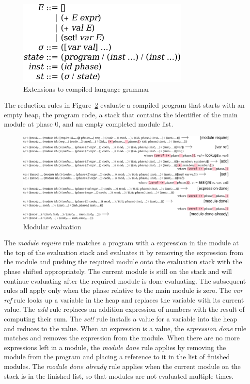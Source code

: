\begin{figure}[h]
\includegraphics{figures/compiled-eval-lang}
\caption{Extensions to compiled language grammar}
\label{fig:compiled-eval-lang}
\end{figure}

The reduction rules in Figure~\ref{fig:eval-reduction} evaluate a compiled program that starts with an empty heap, the program code, a stack that contains the identifier of the main module at phase 0, and an empty completed module list. 

\begin{figure}[h]
\includegraphics[width=\textwidth]{figures/eval-reduction}
\caption{Modular evaluation}
\label{fig:eval-reduction}
\end{figure}

The \emph{module require} rule matches a program with a  expression in the module at the top of the evaluation stack and evaluates it by removing the  expression from the module and pushing the required module onto the evaluation stack with the phase shifted appropriately.
The current module is still on the stack and will continue evaluating after the required module is done evaluating.
The subsequent rules all apply only when the phase relative to the main module is zero.
The \emph{var ref} rule looks up a variable in the heap and replaces the variable with its current value.
The \emph{add} rule replaces an addition expression of numbers with the result of computing their sum.
The \emph{set!} rule installs a value for a variable into the heap and reduces to the value.
When an expression is a value, the \emph{expression done} rule matches and removes the expression from the module.
When there are no more expressions left in a module, the \emph{module done} rule applies by removing the module from the program and placing a reference to it in the list of finished modules.
The \emph{module done already} rule applies when the current module on the stack is in the finished list, so that modules are not evaluated multiple times. 

